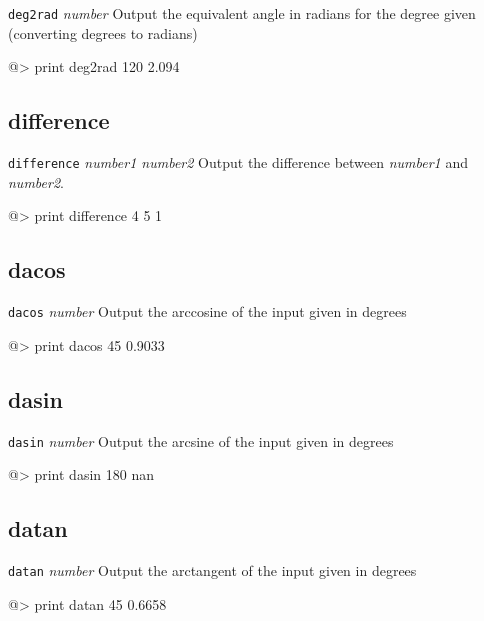 {\tt deg2rad} {\it number} 
\newline\newline 
Output the equivalent angle in radians for the degree given (converting degrees to radians)
\begin{verbatimtab} 
@> print deg2rad 120 
2.094
\end{verbatimtab}
 
\subsection*{difference}  
 
{\tt difference} {\it number1 number2} 
\newline\newline 
Output the difference between {\it number1} and {\it number2}.
\begin{verbatimtab} 
@> print difference 4 5 
1 
\end{verbatimtab}

\subsection*{dacos}  
 
{\tt dacos} {\it number} 
\newline\newline 
Output the arccosine of the input given in degrees 
\begin{verbatimtab} 
@> print dacos 45 
0.9033
\end{verbatimtab}

\subsection*{dasin}  
 
{\tt dasin} {\it number} 
\newline\newline 
Output the arcsine of the input given in degrees 
\begin{verbatimtab} 
@> print dasin 180
nan
\end{verbatimtab}

\subsection*{datan}  
 
{\tt datan} {\it number} 
\newline\newline 
Output the arctangent of the input given in degrees
\begin{verbatimtab} 
@> print datan 45
0.6658
\end{verbatimtab}


